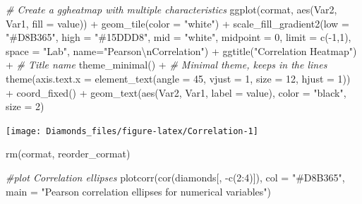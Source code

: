 \documentclass[
]{article}
\newenvironment{Shaded}{\begin{snugshade}}{\end{snugshade}}
\newcommand{\AttributeTok}[1]{\textcolor[rgb]{0.77,0.63,0.00}{#1}}
\newcommand{\CommentTok}[1]{\textcolor[rgb]{0.56,0.35,0.01}{\textit{#1}}}
\newcommand{\DecValTok}[1]{\textcolor[rgb]{0.00,0.00,0.81}{#1}}
\newcommand{\FunctionTok}[1]{\textcolor[rgb]{0.00,0.00,0.00}{#1}}
\newcommand{\NormalTok}[1]{#1}
\newcommand{\SpecialCharTok}[1]{\textcolor[rgb]{0.00,0.00,0.00}{#1}}
\newcommand{\StringTok}[1]{\textcolor[rgb]{0.31,0.60,0.02}{#1}}
\begin{document}
\begin{Shaded}
\begin{Highlighting}[]
\CommentTok{\# Create a ggheatmap with multiple characteristics }
\FunctionTok{ggplot}\NormalTok{(cormat, }\FunctionTok{aes}\NormalTok{(Var2, Var1, }\AttributeTok{fill =}\NormalTok{ value)) }\SpecialCharTok{+}
  \FunctionTok{geom\_tile}\NormalTok{(}\AttributeTok{color =} \StringTok{"white"}\NormalTok{) }\SpecialCharTok{+}
  \FunctionTok{scale\_fill\_gradient2}\NormalTok{(}\AttributeTok{low =} \StringTok{"\#D8B365"}\NormalTok{, }\AttributeTok{high =} \StringTok{"\#15DDD8"}\NormalTok{, }\AttributeTok{mid =} \StringTok{"white"}\NormalTok{,}
                       \AttributeTok{midpoint =} \DecValTok{0}\NormalTok{, }\AttributeTok{limit =} \FunctionTok{c}\NormalTok{(}\SpecialCharTok{{-}}\DecValTok{1}\NormalTok{,}\DecValTok{1}\NormalTok{), }\AttributeTok{space =} \StringTok{"Lab"}\NormalTok{, }\AttributeTok{name=}\StringTok{"Pearson}\SpecialCharTok{\textbackslash{}n}\StringTok{Correlation"}\NormalTok{) }\SpecialCharTok{+}
  \FunctionTok{ggtitle}\NormalTok{(}\StringTok{"Correlation Heatmap"}\NormalTok{) }\SpecialCharTok{+} \CommentTok{\# Title name}
  \FunctionTok{theme\_minimal}\NormalTok{() }\SpecialCharTok{+} \CommentTok{\# Minimal theme, keeps in the lines}
  \FunctionTok{theme}\NormalTok{(}\AttributeTok{axis.text.x =} \FunctionTok{element\_text}\NormalTok{(}\AttributeTok{angle =} \DecValTok{45}\NormalTok{, }\AttributeTok{vjust =} \DecValTok{1}\NormalTok{, }\AttributeTok{size =} \DecValTok{12}\NormalTok{, }\AttributeTok{hjust =} \DecValTok{1}\NormalTok{)) }\SpecialCharTok{+}
  \FunctionTok{coord\_fixed}\NormalTok{() }\SpecialCharTok{+}
  \FunctionTok{geom\_text}\NormalTok{(}\FunctionTok{aes}\NormalTok{(Var2, Var1, }\AttributeTok{label =}\NormalTok{ value), }\AttributeTok{color =} \StringTok{"black"}\NormalTok{, }\AttributeTok{size =} \DecValTok{2}\NormalTok{)}
\end{Highlighting}
\end{Shaded}

\begin{center}\texttt{[image: Diamonds\_files/figure-latex/Correlation-1]} \end{center}

\begin{Shaded}
\begin{Highlighting}[]
\FunctionTok{rm}\NormalTok{(cormat, reorder\_cormat)}
\end{Highlighting}
\end{Shaded}

\begin{Shaded}
\begin{Highlighting}[]
\CommentTok{\#plot Correlation ellipses}
\FunctionTok{plotcorr}\NormalTok{(}\FunctionTok{cor}\NormalTok{(diamonds[, }\SpecialCharTok{{-}}\FunctionTok{c}\NormalTok{(}\DecValTok{2}\SpecialCharTok{:}\DecValTok{4}\NormalTok{)]), }\AttributeTok{col =} \StringTok{"\#D8B365"}\NormalTok{,}
         \AttributeTok{main =} \StringTok{"Pearson correlation ellipses for numerical variables"}\NormalTok{)}
\end{Highlighting}
\end{Shaded}
\end{document}
